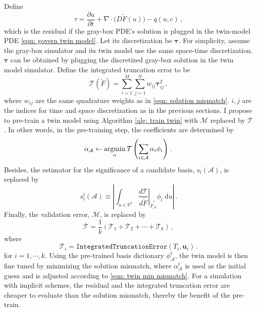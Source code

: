 Define
\begin{equation}
    \tau = \frac{\partial u}{\partial t} 
    + \nabla \cdot \big(D \tilde{F}(u)\big) - q(u,c)\,,
    \label{eqn: residual}
\end{equation}
which is the residual if the gray-box PDE's solution is plugged in the twin-model PDE 
\eqref{eqn: govern twin model}. Let its discretization be $\boldsymbol{\tau}$.
For simplicity, assume the gray-box simulator and its twin model use the same space-time 
discretization. 
$\boldsymbol{\tau}$ can be obtained by plugging the discretized gray-box solution in the
twin model simulator.
Define the integrated truncation error to be
\begin{equation}
    \mathcal{T}(\tilde{F}) = \sum_{i=1}^M \sum_{j=1}^N w_{ij} \boldsymbol{\tau}_{ij}^2 \,,
    \label{eqn: truncation error}
\end{equation}
where $w_{ij}$ are the same quadrature weights as in \eqref{eqn: solution mismatch}. 
$i,j$ are the indices for time and space discretization as in the previous sections.
I propose to pre-train a twin model using Algorithm \ref{alg: train twin} with $\mathcal{M}$
replaced by $\mathcal{T}$. In other words, in the pre-training step, the coefficients are determined by
\begin{equation}
    \alpha_{\mathcal{A}} \leftarrow \operatorname*{\arg\!\min}_{\alpha} \mathcal{T}\left(\sum_{i \in \mathcal{A}}
    \alpha_i \phi_i\right)\,.
    \label{eqn: minimize truncation error}
\end{equation}
Besides, the estimator for the significance of a candidate basis, $s_l(\mathcal{A})$, is replaced by 
\begin{equation}
    s_l^t(\mathcal{A}) \equiv \left|\int_{u\in \mathbb{R}^k} \left.\frac{d\mathcal{T}}{d \tilde{F}}
    \right|_{\tilde{F}_\mathcal{A}^*} \phi_l \; \textrm{d} u \right|\,.
    \label{eqn: basis significance 2}
\end{equation}
Finally, the validation error, $\overline{\mathcal{M}}$, is replaced by
\begin{equation}
    \overline{\mathcal{T}} = \frac{1}{k}\left( \mathcal{T}_1 + \mathcal{T}_2 + \cdots + 
    \mathcal{T}_k\right)\,,
    \label{eqn: pre train validation error}
\end{equation}
where
\begin{equation}
    \mathcal{T}_i = \texttt{IntegratedTruncationError}(T_i, \boldsymbol{u}_i)\,.
\end{equation}
for $i=1, \cdots, k$.
Using the pre-trained basis dictionary $\phi^t_{\mathcal{A}}$,
the twin model is then fine tuned by minimizing the 
solution mismatch, where $\alpha^t_{\mathcal{A}}$ is used as the initial guess and is adjusted 
according to \eqref{eqn: twin min mismatch}. 
For a simulation with implicit schemes, the residual and the integrated truncation error 
are cheaper to evaluate than the solution mismatch, thereby the benefit of the pre-train. \\

